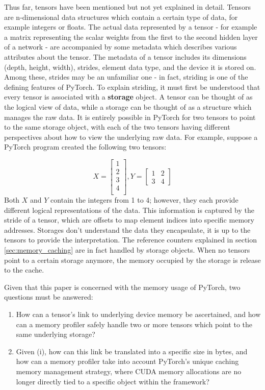 \documentclass[12pt,letterpaper]{article}
\begin{document}
\label{sec:tensors_in_pytorch}
Thus far, tensors have been mentioned but not yet explained in detail. Tensors are n-dimensional data structures which contain a certain type of data, for example integers or floats. The actual data represented by a tensor - for example a matrix representing the scalar weights from the first to the second hidden layer of a network - are accompanied by some metadata which describes various attributes about the tensor. The metadata of a tensor includes its dimensions (depth, height, width), strides, element data type, and the device it is stored on. Among these, strides may be an unfamiliar one - in fact, striding is one of the defining features of PyTorch. To explain striding, it must first be understood that every tensor is associated with a \textbf{storage} object. A tensor can be thought of as the logical view of data, while a storage can be thought of as a structure which manages the raw data. It is entirely possible in PyTorch for two tensors to point to the same storage object, with each of the two tensors having different perspectives about how to view the underlying raw data. For example, suppose a PyTorch program created the following two tensors:

\[
X =
\begin{bmatrix}
    1      \\
    2      \\
    3      \\
    4      \\
\end{bmatrix} 
,
Y =
\begin{bmatrix}
    1  &  2      \\
    3  &  4      
\end{bmatrix} 
\]
Both $X$ and $Y$ contain the integers from 1 to 4; however, they each provide different logical representations of the data. This information is captured by the stride of a tensor, which are offsets to map element indices into specific memory addresses. Storages don't understand the data they encapsulate, it is up to the tensors to provide the interpretation. The reference counters explained in section \ref{sec:memory_caching} are in fact handled by storage objects. When no tensors point to a certain storage anymore, the memory occupied by the storage is release to the cache.  
\par 

Given that this paper is concerned with the memory usage of PyTorch, two questions must be answered:
\begin{enumerate}[label=(\roman*)]
  \item How can a tensor's link to underlying device memory be ascertained, and how can a memory profiler safely handle two or more tensors which point to the same underlying storage?
  \item Given (i), how can this link be translated into a specific size in bytes, and how can a memory profiler take into account PyTorch's unique caching memory management strategy, where CUDA memory allocations are no longer directly tied to a specific object within the framework?
\end{enumerate}
\end{document}
